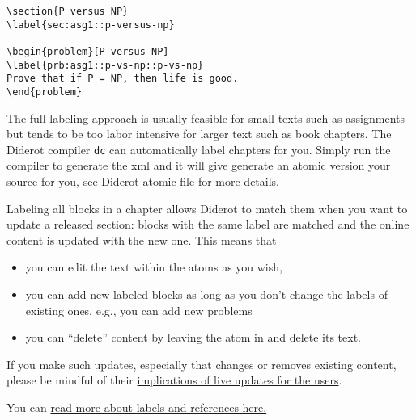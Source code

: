 \begin{example}
\begin{lstlisting}
\section{P versus NP}
\label{sec:asg1::p-versus-np}

\begin{problem}[P versus NP]
\label{prb:asg1::p-vs-np::p-vs-np}
Prove that if P = NP, then life is good.
\end{problem}

\end{lstlisting}
\end{example}


\begin{important}
The full labeling approach is usually feasible for small texts such as assignments but tends to be too labor intensive for larger text such as book chapters.
%
The Diderot compiler \lstinline`dc` can  automatically label chapters for you.  Simply run the compiler to generate the xml and it will give generate an atomic version your source for you, see
 \href{grm:publisg::diderot-atomic}{Diderot atomic  file} 
%
for more details.
\end{important}

Labeling all blocks in a chapter allows Diderot to match them when you want to update a released section: blocks with the same label are matched and the online content is updated with the new one.
%
This means that 
\begin{itemize}

\item you can edit the text within the atoms as you wish,
%

\item you can add new labeled blocks as long as you don't change the labels of existing ones, e.g., you can add new problems

\item you can ``delete'' content by leaving the atom in and delete its text.
\end{itemize}
%
If you make such updates, especially that changes or removes existing content, 
please be mindful of their 
%
\href{grm:publish::released::user-implications}{implications of live updates for the users}.

\begin{note}
You can \href{sec:dc::labels-refs}{read more about labels and references here.}
\end{note}

